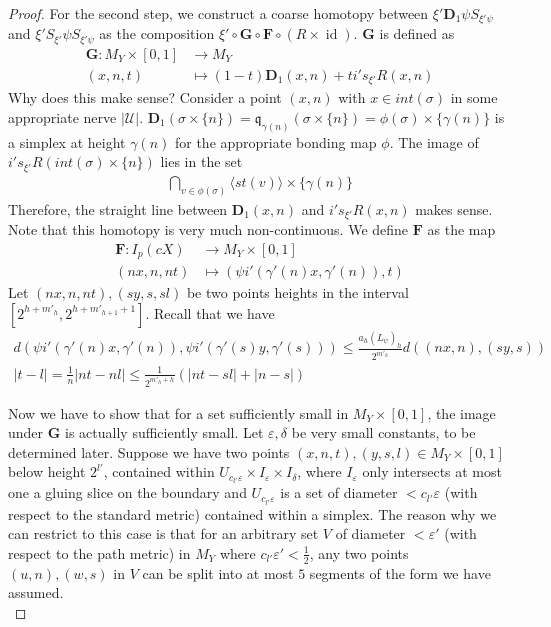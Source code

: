 \documentclass[10pt,a4paper]{amsart}
\DeclareMathOperator{\id}{id}
\begin{document}
\begin{proof}
For the second step, we construct a coarse homotopy between $\xi' \mathbf{D}_{1} \psi S_{\xi' \psi}$ and $\xi' S_{\xi'} \psi S_{\xi' \psi}$ as the composition $\xi' \circ \mathbf{G}\circ \mathbf{F} \circ (R\times \id)$. $\mathbf{G}$ is defined as
\begin{align*}
\mathbf{G}: M_{Y} \times [0,1] &\rightarrow M_{Y}\\
(x,n,t) &\mapsto (1-t) \mathbf{D}_{1}(x,n) + t i's_{\xi'} R (x,n) 
\end{align*}
Why does this make sense? Consider a point $(x,n)$ with $x\in int(\sigma)$ in some appropriate nerve $|\mathcal{U}|$. $\mathbf{D}_{1}(\sigma \times \{ n\}) = \mathfrak{q}_{\gamma(n)}(\sigma \times \{n\}) = \phi(\sigma) \times \{\gamma(n)\}$ is a simplex at height $\gamma(n)$ for the appropriate bonding map $\phi$.  The image of $i's_{\xi'} R(int(\sigma) \times \{n\})$ lies in the set 
\begin{align*}
\bigcap_{v \in \phi (\sigma)} \langle st(v) \rangle  \times \{\gamma(n)\}
\end{align*} 
Therefore, the straight line between $ \mathbf{D}_{1}(x,n) $ and $i's_{\xi'} R (x,n)$ makes sense. Note that this homotopy is very much non-continuous. We define $\mathbf{F}$ as the map
\begin{align*}
\mathbf{F}: I_{p}(cX) &\rightarrow M_{Y} \times [0,1]\\
(nx,n,nt) &\mapsto (\psi i'(\gamma'(n)x,\gamma'(n)), t)
\end{align*}
Let $(nx,n,nt),(sy,s,sl)$ be two points heights in the interval  $[2^{h+m'_{h}},2^{h+m'_{h+1}+1}]$. Recall that we have 
\begin{align*}
d(\psi i'(\gamma'(n) x,\gamma'(n)), \psi i'(\gamma'(s) y,\gamma'(s)))
\leq \frac{a_{h}(L_{\psi})_{h}}{2^{m'_{h}}} d((nx,n), (sy,s))\\ 
|t-l| = \frac{1}{n}|nt-nl| \leq \frac{1}{2^{m'_{h}+h}}(|nt-sl| + |n-s|)
\end{align*}

Now we have to show that for a set sufficiently small in $M_{Y}\times [0,1]$, the image under $\mathbf{G}$ is actually sufficiently small. Let $\varepsilon, \delta$ be very small constants, to be determined later. Suppose we have two points $(x,n,t),(y,s,l) \in M_{Y} \times [0,1]$ below height $2^{l'}$, contained within $U_{c_{l'}\varepsilon} \times I_{\varepsilon} \times I_{\delta}$, where $I_{\varepsilon}$ only intersects at most one a gluing slice on the boundary and $U_{c_{l'}\varepsilon}$ is a set of diameter $<c_{l'}\varepsilon$ (with respect to the standard metric) contained within a simplex. The reason why we can restrict to this case is that for an arbitrary set $V$ of diameter $<\varepsilon'$ (with respect to the path metric) in $M_{Y}$ where $c_{l'}\varepsilon'<\frac{1}{2}$,  any two points $(u,n),(w,s)$ in $V$ can be split into at most $5$ segments of the form we have assumed. \\


\end{proof}
\end{document}
